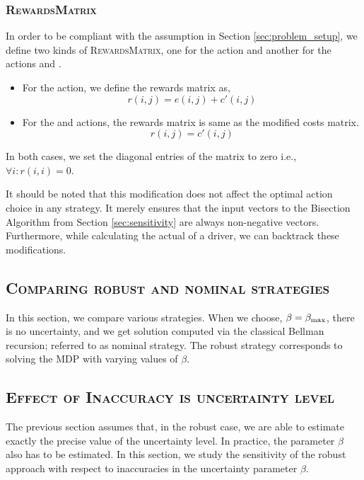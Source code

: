 \subsubsection{\textsc{RewardsMatrix}}
In order to be compliant with the assumption in Section \ref{sec:problem_setup}, we define two kinds of \textsc{RewardsMatrix}, one for the action {\getpassenger} and another for the actions {\gohome} and {\relocate}.

\begin{itemize}
	\item For the {\getpassenger} action, we define the rewards matrix as,
	\begin{equation}
		r(i,j) = e(i,j) + c'(i,j) 
	\end{equation}
	\item For the {\gohome} and {\relocate} actions, the rewards matrix is same as the modified costs matrix.
	\begin{equation}
		r(i,j) = c'(i,j)
	\end{equation}
\end{itemize}
In both cases, we set the diagonal entries of the matrix to zero i.e., $\forall i: r(i,i) = 0$.

It should be noted that this modification does not affect the optimal action choice in any strategy. It merely ensures that the input vectors to the Bisection Algorithm from Section \ref{sec:sensitivity} are always non-negative vectors. Furthermore, while calculating the actual {\totalexpectedearnings} of a driver, we can backtrack these modifications.

\subsection{\textsc{Comparing robust and nominal strategies}}
In this section, we compare various strategies. When we choose, $\beta = \beta_{\textrm{max}}$, there is no uncertainty, and we get solution computed via the classical Bellman recursion; referred to as nominal strategy. The robust strategy corresponds to solving the MDP with varying values of $\beta$.

\subsection{\textsc{Effect of Inaccuracy is uncertainty level}}
The previous section assumes that, in the robust case, we are able to estimate exactly the precise value of the uncertainty level. In practice, the parameter $\beta$ also has to be estimated. In this section, we study the sensitivity of the robust approach with respect to inaccuracies in the uncertainty parameter $\beta$.